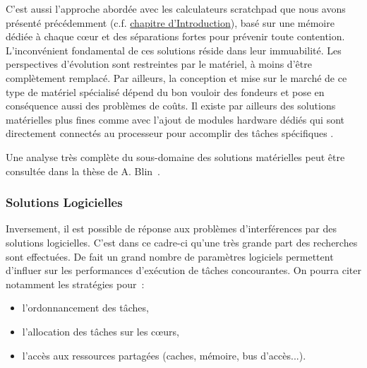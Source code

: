 \documentclass[french, a4paper, 11pt, twoside, pdftex]{StyleThese}
\begin{document}
    C'est aussi l'approche abordée avec les calculateurs scratchpad que nous avons présenté précédemment (c.f. \hyperref[Intro:multicoeurs]{chapitre d'Introduction}), basé sur une mémoire dédiée à chaque cœur et des séparations fortes pour prévenir toute contention. L'inconvénient fondamental de ces solutions réside dans leur immuabilité. Les perspectives d'évolution sont restreintes par le matériel, à moins d'être complètement remplacé. Par ailleurs, la conception et mise sur le marché de ce type de matériel spécialisé dépend du bon vouloir des fondeurs et pose en conséquence aussi des problèmes de coûts. Il existe par ailleurs des solutions matérielles plus fines comme avec l'ajout de modules hardware dédiés qui sont directement connectés au processeur pour accomplir des tâches spécifiques \cite{solet_hw-based_2018}. 
    
    Une analyse très complète du sous-domaine des solutions matérielles peut être consultée dans la thèse de A. Blin~\cite{blin_vers_2017}.
    
    
    \subsubsection{Solutions Logicielles}
    Inversement, il est possible de réponse aux problèmes d'interférences par des solutions logicielles. C'est dans ce cadre-ci qu'une très grande part des recherches sont effectuées. De fait un grand nombre de paramètres logiciels permettent d'influer sur les performances d'exécution de tâches concourantes. On pourra citer notamment les stratégies pour~: 
    \begin{itemize}
    	\item	l'ordonnancement des tâches,
    	\item	l'allocation des tâches sur les cœurs,
    	\item 	l'accès aux ressources partagées (caches, mémoire, bus d'accès...).
    \end{itemize}
\end{document}
